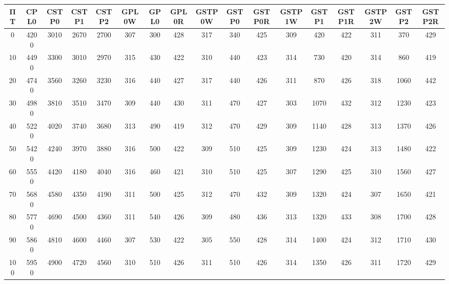 \begin{tabular}{|c|c|c|c|c|c|c|c|c|c|c|c|c|c|c|c|c|}
\hline
ΠΤ&CPL0&CSTP0&CSTP1&CSTP2&GPL0W&GPL0&GPL0R&GSTP0W&GSTP0&GSTP0R&GSTP1W&GSTP1&GSTP1R&GSTP2W&GSTP2&GSTP2R\\\hline
\hline
0&4200&3010&2670&2700&307&300&428&317&340&425&309&420&422&311&370&429\\
\hline
10&4490&3300&3010&2970&315&430&422&310&440&423&314&730&420&314&860&419\\
\hline
20&4740&3560&3260&3230&316&440&427&317&440&426&311&870&426&318&1060&442\\
\hline
30&4980&3810&3510&3470&309&440&430&311&470&427&303&1070&432&312&1230&423\\
\hline
40&5220&4020&3740&3680&313&490&419&312&470&429&309&1140&428&313&1370&426\\
\hline
50&5420&4240&3970&3880&316&500&422&309&510&425&309&1230&424&313&1480&422\\
\hline
60&5550&4420&4180&4040&316&460&421&310&510&425&307&1290&425&310&1560&427\\
\hline
70&5680&4580&4350&4190&311&500&425&312&470&432&309&1320&424&307&1650&421\\
\hline
80&5770&4690&4500&4360&311&540&426&309&480&436&313&1320&433&308&1700&428\\
\hline
90&5860&4810&4600&4460&307&530&422&305&550&428&314&1400&424&312&1710&430\\
\hline
100&5950&4900&4720&4560&310&510&426&311&510&426&314&1350&426&311&1720&429\\
\hline
\end{tabular}

